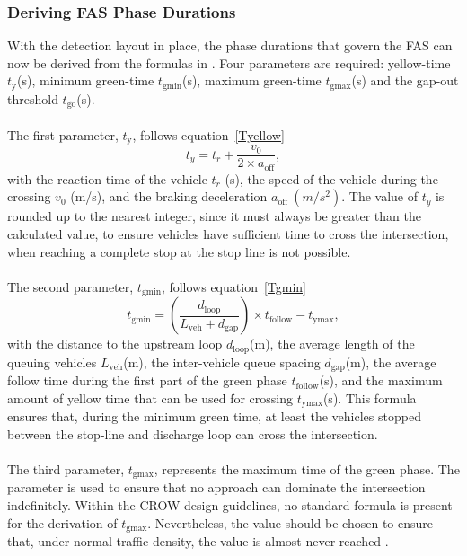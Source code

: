 \subsubsection{Deriving FAS Phase Durations}
\label{Phase durations}
With the detection layout in place, the phase durations that govern the FAS can now be derived from the formulas in \parencite{wilson2014handboek}. Four parameters are required: yellow-time \(t_\text{y}\)(s), minimum green-time \(t_\text{gmin}\)(s), maximum green-time \(t_\text{gmax}\)(s) and the gap-out threshold \(t_\text{go}\)(s). 
\\\\
The first parameter, \(t_\text{y}\), follows equation~\ref{Tyellow}\begin{equation}
\label{Tyellow}
    t_y=t_r+\frac{v_0}{2\times a_\text{off}},
\end{equation} with the reaction time of the vehicle \(t_r\) (s),  the speed of the vehicle during the crossing \(v_0\) (m/s), and the braking deceleration \(a_\text{off} \ (m/s^2)\). The value of \(t_y\) is rounded up to the nearest integer, since it must always be greater than the calculated value, to ensure vehicles have sufficient time to cross the intersection, when reaching a complete stop at the stop line is not possible. 
\\\\
The second parameter, \(t_\text{gmin}\), follows equation~\ref{Tgmin} \begin{equation}
\label{Tgmin}
    t_\text{gmin}=\left(\frac{d_\text{loop}}{L_\text{veh}+d_\text{gap}}\right)\times t_\text{follow} -t_\text{ymax},
\end{equation}
with the distance to the upstream loop \(d_\text{loop}\)(m), the average length of the queuing vehicles \(L_\text{veh}\)(m), the inter-vehicle queue spacing \(d_\text{gap}\)(m), the average follow time during the first part of the green phase \(t_\text{follow}\)(s), and the maximum amount of yellow time that can be used for crossing  \(t_\text{ymax}\)(s). This formula ensures that, during the minimum green time, at least the vehicles stopped between the stop-line and discharge loop can cross the intersection.
\\\\
The third parameter, \(t_\text{gmax}\), represents the maximum time of the green phase. The parameter is used to ensure that no approach can dominate the intersection indefinitely. Within the CROW design guidelines, no standard formula is present for the derivation of \(t_\text{gmax}\). Nevertheless, the value should be chosen to ensure that, under normal traffic density, the value is almost never reached \parencite{wilson2014handboek}.
